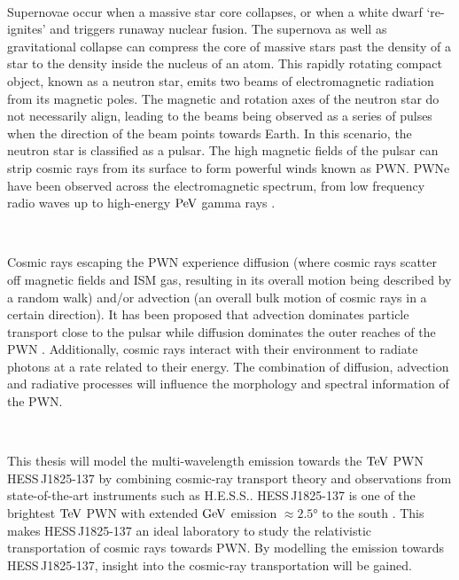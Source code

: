 \par~\par 
Supernovae occur when a massive star core collapses, or when a white dwarf `re-ignites' and triggers runaway nuclear fusion. The supernova as well as gravitational collapse can compress the core of massive stars past the density of a star to the density inside the nucleus of an atom. This rapidly rotating compact object, known as a neutron star, emits two beams of electromagnetic radiation from its magnetic poles. The magnetic and rotation axes of the neutron star do not necessarily align, leading to the beams being observed as a series of pulses when the direction of the beam points towards Earth. In this scenario, the neutron star is classified as a pulsar. The high magnetic fields of the pulsar can strip cosmic rays from its surface to form powerful winds known as PWN. PWNe have been observed across the electromagnetic spectrum, from low frequency radio waves \citep{1968Natur.217..709H} up to high-energy $\PeV$ gamma rays \citep{doi:10.1126/science.abg5137}.
\par~\par
Cosmic rays escaping the PWN experience diffusion (where cosmic rays scatter off magnetic fields and ISM gas, resulting in its overall motion being described by a random walk) and/or advection (an overall bulk motion of cosmic rays in a certain direction). It has been proposed that advection dominates particle transport close to the pulsar while diffusion dominates the outer reaches of the PWN \citep{2020A&A...636A.113G, 2021PhRvD.104l3017R}. Additionally, cosmic rays interact with their environment to radiate photons at a rate related to their energy. The combination of diffusion, advection and radiative processes will influence the morphology and spectral information of the PWN.
\par~\par 
This thesis will model the multi-wavelength emission towards the $\TeV$ PWN \mbox{HESS\,J1825-137} by combining cosmic-ray transport theory and observations from state-of-the-art instruments such as H.E.S.S.. \mbox{HESS\,J1825-137} is one of the brightest $\TeV$ PWN with extended $\si{\giga\electronvolt}$ emission $\approx \ang{2.5}$ to the south \citep{2019MNRAS.485.1001A}. This makes \mbox{HESS\,J1825-137} an ideal laboratory to study the relativistic transportation of cosmic rays towards PWN. By modelling the emission towards \mbox{HESS\,J1825-137}, insight into the cosmic-ray transportation will be gained.
\par~\par
